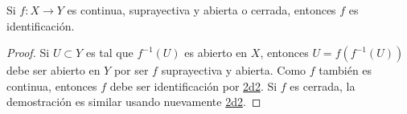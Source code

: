 
\begin{proposition}
Si $f : X \longrightarrow Y$ es continua, suprayectiva y abierta o cerrada, entonces $f$ es identificación.
\end{proposition}

\begin{proof}
Si $U \subset Y$ es tal que $f^{-1}(U)$ es abierto en $X$, entonces $U = f(f^{-1}(U))$ debe ser abierto en $Y$ por ser $f$ suprayectiva y abierta. Como $f$ también es continua, entonces $f$ debe ser identificación por \hyperref[card:2d2]{\textsf{2d2}}. Si $f$ es cerrada, la demostración es similar usando nuevamente \hyperref[card:2d2]{\textsf{2d2}}.

\end{proof}
